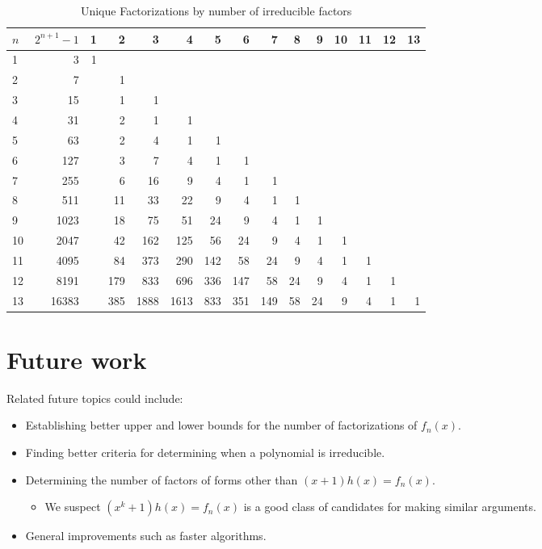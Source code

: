     \begin{table}[h!]
    \centering
    \caption{Unique Factorizations by number of irreducible factors}
    \label{tab:data}
    \begin{tabular}{|l|*{14}{r|}}
        \hline
        $n$  & $2^{n+1}-1$ & 1 & 2 & 3 & 4 & 5 & 6 & 7 & 8 & 9 & 10 & 11 & 12 & 13 \\
        \hline
        1  & 3 & 1 & & & & & & & & & & & & \\
        \hline
        2  & 7 & & 1 & & & & & & & & & & & \\
        \hline
        3  & 15 & & 1 & 1 & & & & & & & & & & \\
        \hline
        4  & 31 & & 2 & 1 & 1 & & & & & & & & & \\
        \hline
        5  & 63 & & 2 & 4 & 1 & 1 & & & & & & & & \\
        \hline
        6  & 127 & & 3 & 7 & 4 & 1 & 1 & & & & & & & \\
        \hline
        7  & 255 & & 6 & 16 & 9 & 4 & 1 & 1 & & & & & & \\
        \hline
        8  & 511 & & 11 & 33 & 22 & 9 & 4 & 1 & 1 & & & & & \\
        \hline
        9  & 1023 & & 18 & 75 & 51 & 24 & 9 & 4 & 1 & 1 & & & & \\
        \hline
        10  & 2047 & & 42 & 162 & 125 & 56 & 24 & 9 & 4 & 1 & 1 & & & \\
        \hline
        11 & 4095 & & 84 & 373 & 290 & 142 & 58 & 24 & 9 & 4 & 1 & 1 & & \\
        \hline
        12 & 8191 & & 179 & 833 & 696 & 336 & 147 & 58 & 24 & 9 & 4 & 1 & 1 & \\
        \hline
        13 & 16383 & & 385 & 1888 & 1613 & 833 & 351 & 149 & 58 & 24 & 9 & 4 & 1 & 1 \\
        \hline
    \end{tabular}
\end{table}

\pagebreak
\section{Future work}
Related future topics could include:
\begin{itemize}
    \item Establishing better upper and lower bounds for the number of factorizations of $f_n(x)$.
    \item Finding better criteria for determining when a polynomial is irreducible.
    \item Determining the number of factors of forms other than $(x + 1)h(x) = f_n(x)$.
    
    \begin{itemize}
        \item We suspect $(x^k + 1)h(x) = f_n(x)$ is a good class of candidates for making similar arguments.
    \end{itemize}
    \item General improvements such as faster algorithms.
\end{itemize}

\pagebreak


\nocite{*}


